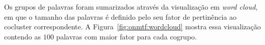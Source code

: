\documentclass[
    12pt,                %
    oneside,            %
    a4paper,            %
    english,            %
    brazil                %
    ]{abntex2ppgsi}
\begin{document}
\begin{table}[H]
\label{tab:onmtf:matrizS}
\centering
    \caption{Matriz $S$ para \textit{ONMTF} com $k = l = 3$.}
\end{table}

Os grupos de palavras foram sumarizados através da visualização em \textit{word cloud}, em que o tamanho das palavras é definido pelo seu fator de pertinência ao cocluster correspondente.
A Figura~\ref{fig:onmtf:wordcloud} mostra essa visualização contendo as $100$ palavras com maior fator para cada cogrupo.
\end{document}
